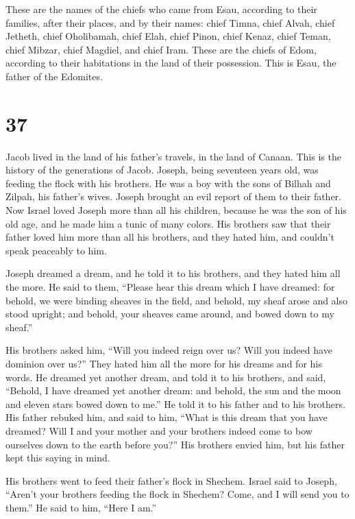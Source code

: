  These are the names of the chiefs who came from Esau,
according to their families, after their places, and by their names:
chief Timna, chief Alvah, chief Jetheth,  chief Oholibamah,
chief Elah, chief Pinon,  chief Kenaz, chief Teman, chief
Mibzar,  chief Magdiel, and chief Iram. These are the
chiefs of Edom, according to their habitations in the land of their
possession. This is Esau, the father of the Edomites.

\hypertarget{section-36}{%
\section{37}\label{section-36}}

 Jacob lived in the land of his father's travels, in the
land of Canaan.  This is the history of the generations of
Jacob. Joseph, being seventeen years old, was feeding the flock with his
brothers. He was a boy with the sons of Bilhah and Zilpah, his father's
wives. Joseph brought an evil report of them to their father.
 Now Israel loved Joseph more than all his children, because
he was the son of his old age, and he made him a tunic of many colors.
 His brothers saw that their father loved him more than all
his brothers, and they hated him, and couldn't speak peaceably to him.

 Joseph dreamed a dream, and he told it to his brothers, and
they hated him all the more.  He said to them, ``Please hear
this dream which I have dreamed:  for behold, we were
binding sheaves in the field, and behold, my sheaf arose and also stood
upright; and behold, your sheaves came around, and bowed down to my
sheaf.''

 His brothers asked him, ``Will you indeed reign over us?
Will you indeed have dominion over us?'' They hated him all the more for
his dreams and for his words.  He dreamed yet another dream,
and told it to his brothers, and said, ``Behold, I have dreamed yet
another dream: and behold, the sun and the moon and eleven stars bowed
down to me.''  He told it to his father and to his
brothers. His father rebuked him, and said to him, ``What is this dream
that you have dreamed? Will I and your mother and your brothers indeed
come to bow ourselves down to the earth before you?''  His
brothers envied him, but his father kept this saying in mind.

 His brothers went to feed their father's flock in Shechem.
 Israel said to Joseph, ``Aren't your brothers feeding the
flock in Shechem? Come, and I will send you to them.'' He said to him,
``Here I am.''

